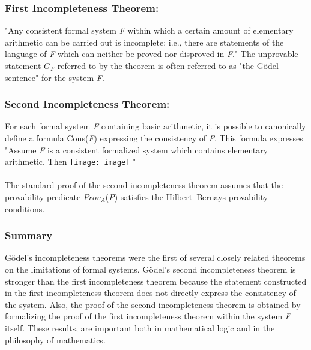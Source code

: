 \documentclass[a4paper,10pt]{article}
\begin{document}
\subsubsection*{First Incompleteness Theorem:} "Any consistent formal system \emph{F} within which a certain amount of elementary arithmetic can be carried out is incomplete; i.e., there are statements of the language of \emph{F} which can neither be proved nor disproved in \emph{F}." 
The unprovable statement $G_{F}$ referred to by the theorem is often referred to as "the Gödel sentence" for the system \emph{F}. 

\subsubsection*{Second Incompleteness Theorem:} 
For each formal system \emph{F} containing basic arithmetic, it is possible to canonically define a formula Cons(\emph{F}) expressing the consistency of \emph{F}. This formula expresses\\

 "Assume \emph{F} is a consistent formalized system which contains elementary arithmetic. Then \texttt{[image: image]} " \\\\
 The standard proof of the second incompleteness theorem assumes that the provability predicate $Prov_{A}$(\emph{P}) satisfies the Hilbert–Bernays provability conditions. 

\subsubsection*{Summary}
Gödel's incompleteness theorems were the first of several closely related theorems on the limitations of formal systems. Gödel's second incompleteness theorem is stronger than the first incompleteness theorem because the statement constructed in the first incompleteness theorem does not directly express the consistency of the system. Also, the proof of the second incompleteness theorem is obtained by formalizing the proof of the first incompleteness theorem within the system \emph{F} itself. These results, are important both in mathematical logic and in the philosophy of mathematics. 
\end{document}
